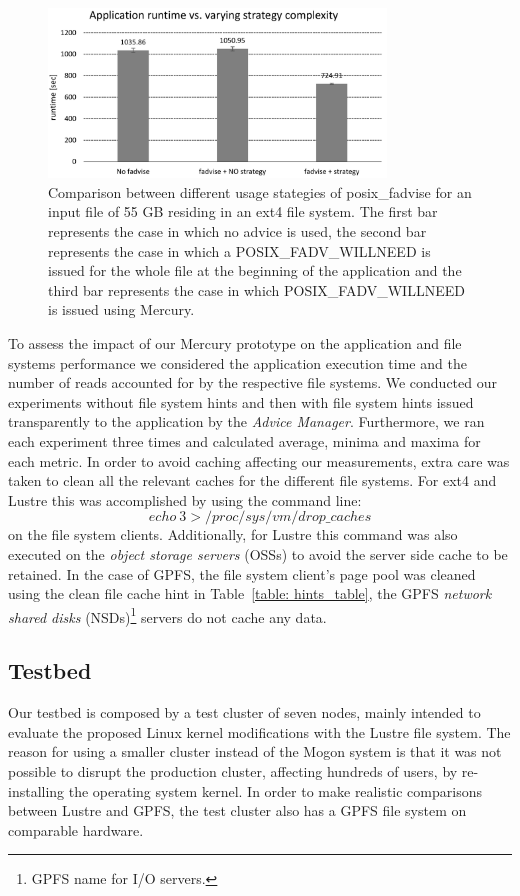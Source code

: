 \begin{figure}[!htb]
  \centering
  \includegraphics[width=0.8\textwidth]{figures/test_fadvise_no_border}
  \caption{Comparison between different usage stategies of posix\_fadvise for an input file of 55 GB residing in an ext4 file system. The first bar represents the case in which no advice is used, 
  the second bar represents the case in which a POSIX\_FADV\_WILLNEED is issued for the whole file at the beginning of the application and the third bar represents the case in which POSIX\_FADV\_WILLNEED 
  is issued using Mercury.}
  \label{figure: fadvise_comparison}
\end{figure} 

To assess the impact of our Mercury prototype on the application and file systems performance we considered the application execution time and the number of reads accounted for by the respective file systems. 
We conducted our experiments without file system hints and then with file system hints issued transparently to the application by the \textit{Advice Manager}. Furthermore, we ran each experiment three 
times and calculated average, minima and maxima for each metric. In order to avoid caching affecting our measurements, extra care was taken to clean all the relevant caches for the different file systems. 
For ext4 and Lustre this was accomplished by using the command line: $$echo\ 3 > /proc/sys/vm/drop\_caches$$ on the file system clients. Additionally, for Lustre this command was also executed on the
\textit{object storage servers} (OSSs) to avoid the server side cache to be retained. In the case of GPFS, the file system client's page pool was cleaned using the clean file cache hint in Table~\ref{table: hints_table}, 
the GPFS \textit{network shared disks} (NSDs)\footnote{GPFS name for I/O servers.} servers do not cache any data. 


\subsection{Testbed}
Our testbed is composed by a test cluster of seven nodes, mainly intended to evaluate the proposed Linux kernel modifications with the Lustre file system. The reason 
for using a smaller cluster instead of the Mogon system is that it was not possible to disrupt the production cluster, affecting hundreds of users, by re-installing 
the operating system kernel. In order to make realistic comparisons between Lustre and GPFS, the test cluster also has a GPFS file system on comparable hardware. 

